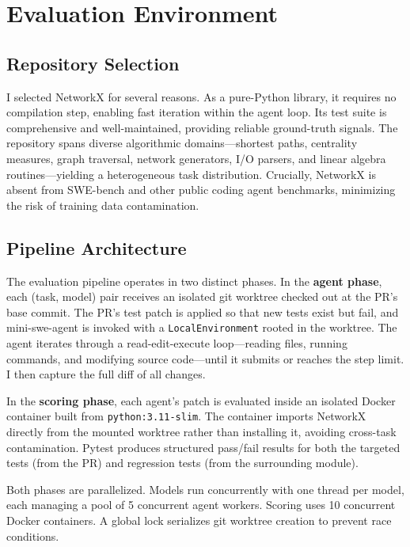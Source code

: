 \documentclass[10pt]{article}
\begin{document}
\section{Evaluation Environment}

\subsection{Repository Selection}

I selected NetworkX for several reasons. As a pure-Python library, it requires no compilation step, enabling fast iteration within the agent loop. Its test suite is comprehensive and well-maintained, providing reliable ground-truth signals. The repository spans diverse algorithmic domains---shortest paths, centrality measures, graph traversal, network generators, I/O parsers, and linear algebra routines---yielding a heterogeneous task distribution. Crucially, NetworkX is absent from SWE-bench and other public coding agent benchmarks, minimizing the risk of training data contamination.

\subsection{Pipeline Architecture}

The evaluation pipeline operates in two distinct phases. In the \textbf{agent phase}, each (task, model) pair receives an isolated git worktree checked out at the PR's base commit. The PR's test patch is applied so that new tests exist but fail, and mini-swe-agent is invoked with a \texttt{LocalEnvironment} rooted in the worktree. The agent iterates through a read-edit-execute loop---reading files, running commands, and modifying source code---until it submits or reaches the step limit. I then capture the full diff of all changes.

In the \textbf{scoring phase}, each agent's patch is evaluated inside an isolated Docker container built from \texttt{python:3.11-slim}. The container imports NetworkX directly from the mounted worktree rather than installing it, avoiding cross-task contamination. Pytest produces structured pass/fail results for both the targeted tests (from the PR) and regression tests (from the surrounding module).

Both phases are parallelized. Models run concurrently with one thread per model, each managing a pool of 5 concurrent agent workers. Scoring uses 10 concurrent Docker containers. A global lock serializes git worktree creation to prevent race conditions.
\end{document}
